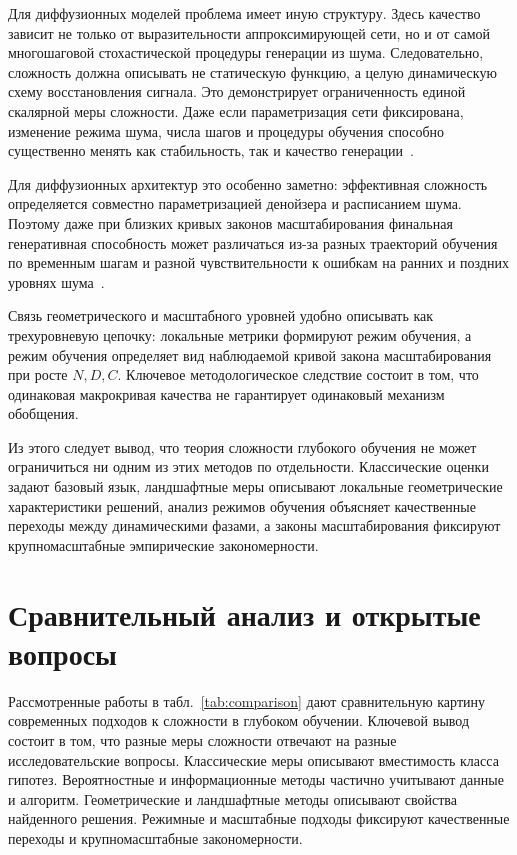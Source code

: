 \documentclass[russian]{intsys}
\begin{document}
Для диффузионных моделей проблема имеет иную структуру.
Здесь качество зависит не только от выразительности аппроксимирующей сети, но и от самой многошаговой стохастической процедуры генерации из шума.
Следовательно, сложность должна описывать не статическую функцию, а целую динамическую схему восстановления сигнала.
Это демонстрирует ограниченность единой скалярной меры сложности.
Даже если параметризация сети фиксирована, изменение режима шума, числа шагов и процедуры обучения способно существенно менять как стабильность, так и качество генерации~\cite{ho2020denoising}.

Для диффузионных архитектур это особенно заметно: эффективная сложность определяется совместно параметризацией денойзера и расписанием шума. Поэтому даже при близких кривых законов масштабирования финальная генеративная способность может различаться из-за разных траекторий обучения по временным шагам и разной чувствительности к ошибкам на ранних и поздних уровнях шума~\cite{diffusionTransformerScaling2024}.

Связь геометрического и масштабного уровней удобно описывать как трехуровневую цепочку: локальные метрики формируют режим обучения, а режим обучения определяет вид наблюдаемой кривой закона масштабирования при росте $N,D,C$. Ключевое методологическое следствие состоит в том, что одинаковая макрокривая качества не гарантирует одинаковый механизм обобщения.

Из этого следует вывод, что теория сложности глубокого обучения не может ограничиться ни одним из этих методов по отдельности.
Классические оценки задают базовый язык, ландшафтные меры описывают локальные геометрические характеристики решений, анализ режимов обучения объясняет качественные переходы между динамическими фазами, а законы масштабирования фиксируют крупномасштабные эмпирические закономерности.

\section{Сравнительный анализ и открытые вопросы}

Рассмотренные работы в табл.~\ref{tab:comparison} дают сравнительную картину современных подходов к сложности в глубоком обучении.
Ключевой вывод состоит в том, что разные меры сложности отвечают на разные исследовательские вопросы.
Классические меры описывают вместимость класса гипотез.
Вероятностные и информационные методы частично учитывают данные и алгоритм.
Геометрические и ландшафтные методы описывают свойства найденного решения.
Режимные и масштабные подходы фиксируют качественные переходы и крупномасштабные закономерности.
\end{document}
